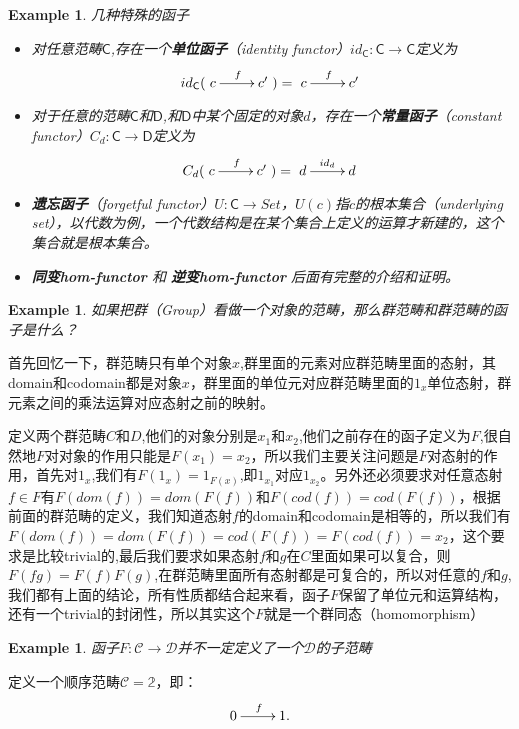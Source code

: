 \documentclass[UTF8,11pt,a4paper]{ctexart}
\newtheorem{example}[theorem]{Example}
\newcommand{\tbf}{\textbf}
\newcommand*{\cat}[1]{\textsf{#1}\xspace}
\newcommand*{\xfunc}[4]{{#2}\colon{#3}{#1}{#4}}
\newcommand*{\func}[3]{\xfunc{\to}{#1}{#2}{#3}}
\begin{document}
\begin{example}
几种特殊的函子
	\begin{itemize}
		\item 对任意范畴$\cat{C}$,存在一个\tbf{单位函子}（identity functor）$\func{id_{\cat{C}}}{\cat{C}}{\cat{C}}$定义为\[id_{\cat{C}}(\xymatrix{c\ar[r]^f&c'})=\xymatrix{c\ar[r]^f&c'}\]
		\item 对于任意的范畴$\cat{C}$和$\cat{D}$,和$\cat{D}$中某个固定的对象$d$，存在一个\tbf{常量函子}（constant functor）$\func{C_{d}}{\cat{C}}{\cat{D}}$定义为\[C_{d}(\xymatrix{c\ar[r]^f&c'})=\xymatrix{d\ar[r]^{id_d}&d}\]
		\item \tbf{遗忘函子}（forgetful functor）$\func{U}{\cat{C}}{Set}$，$U(c)$指$c$的根本集合（underlying set），以代数为例，一个代数结构是在某个集合上定义的运算才新建的，这个集合就是根本集合。
		\item \tbf{同变hom-functor} 和 \tbf{逆变hom-functor} 后面有完整的介绍和证明。
	\end{itemize}
	
\end{example}


\begin{example}
如果把群（Group）看做一个对象的范畴，那么群范畴和群范畴的函子是什么？
\end{example}
首先回忆一下，群范畴只有单个对象$x$,群里面的元素对应群范畴里面的态射，其domain和codomain都是对象$x$，群里面的单位元对应群范畴里面的$1_x$单位态射，群元素之间的乘法运算对应态射之前的映射。

定义两个群范畴$C$和$D$,他们的对象分别是$x_1$和$x_2$,他们之前存在的函子定义为$F$,很自然地$F$对对象的作用只能是$F(x_1) = x_2$，所以我们主要关注问题是$F$对态射的作用，首先对$1_x$,我们有$F(1_x)=1_{F(x)}$,即$1_{x_1}$对应$1_{x_2}$。另外还必须要求对任意态射$f \in F$有$F(dom(f))=dom(F(f))$和$F(cod(f))=cod(F(f))$，根据前面的群范畴的定义，我们知道态射$f$的domain和codomain是相等的，所以我们有$F(dom(f))=dom(F(f))=cod(F(f))=F(cod(f))=x_2$，这个要求是比较trivial的,最后我们要求如果态射$f$和$g$在$C$里面如果可以复合，则$F(fg)=F(f)F(g)$,在群范畴里面所有态射都是可复合的，所以对任意的$f$和$g$,我们都有上面的结论，所有性质都结合起来看，函子$F$保留了单位元和运算结构，还有一个trivial的封闭性，所以其实这个$F$就是一个群同态（homomorphism）


\begin{example}
函子$F: \mathcal{C} \rightarrow \mathcal{D}$并不一定定义了一个$\mathcal{D}$的子范畴
\end{example}

定义一个顺序范畴$\mathcal{C}  = \mathbb{2}$，即：
\[\xymatrix{0\ar[r]^f&1.}\]
\end{document}

